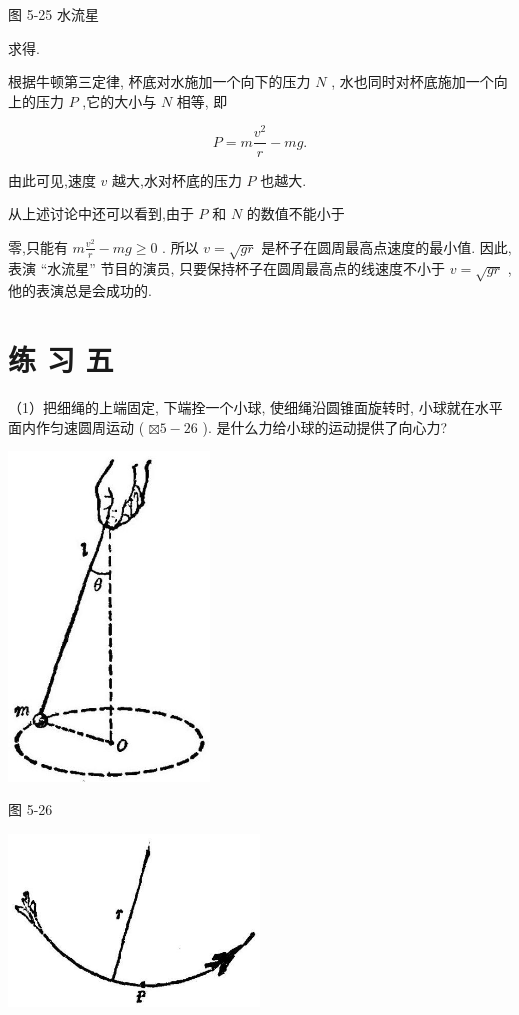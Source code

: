 \documentclass[10pt]{article}
\begin{document}
图 5-25 水流星

求得.

根据牛顿第三定律, 杯底对水施加一个向下的压力 \(N\) , 水也同时对杯底施加一个向上的压力 \(P\) ,它的大小与 \(N\) 相等, 即

\[
P = m\frac{{v}^{2}}{r} - {mg}.
\]

由此可见,速度 \(v\) 越大,水对杯底的压力 \(P\) 也越大.

从上述讨论中还可以看到,由于 \(P\) 和 \(N\) 的数值不能小于

零,只能有 \(m\frac{{v}^{2}}{r} - {mg} \geq 0\) . 所以 \(v = \sqrt{gr}\) 是杯子在圆周最高点速度的最小值. 因此, 表演 “水流星” 节目的演员, 只要保持杯子在圆周最高点的线速度不小于 \(v = \sqrt{gr}\) ,他的表演总是会成功的.

\section*{练 习 五}

（1）把细绳的上端固定, 下端拴一个小球, 使细绳沿圆锥面旋转时, 小球就在水平面内作匀速圆周运动 ( \(\boxtimes 5 - {26}\) ). 是什么力给小球的运动提供了向心力?

\begin{center}
\includegraphics[max width=0.4\textwidth]{images/01912d55-147c-70aa-b0e0-1782a122f948_151_419054.jpg}
\end{center}

图 5-26

\begin{center}
\includegraphics[max width=0.5\textwidth]{images/01912d55-147c-70aa-b0e0-1782a122f948_151_485968.jpg}
\end{center}
\end{document}
